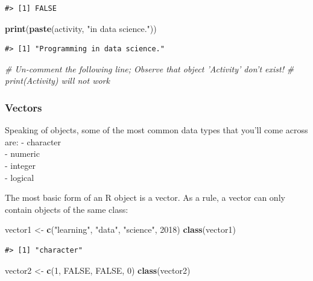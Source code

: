 \documentclass[]{article}
\newenvironment{Shaded}{\begin{snugshade}}{\end{snugshade}}
\newcommand{\CommentTok}[1]{\textcolor[rgb]{0.56,0.35,0.01}{\textit{#1}}}
\newcommand{\DecValTok}[1]{\textcolor[rgb]{0.00,0.00,0.81}{#1}}
\newcommand{\KeywordTok}[1]{\textcolor[rgb]{0.13,0.29,0.53}{\textbf{#1}}}
\newcommand{\NormalTok}[1]{#1}
\newcommand{\OtherTok}[1]{\textcolor[rgb]{0.56,0.35,0.01}{#1}}
\newcommand{\StringTok}[1]{\textcolor[rgb]{0.31,0.60,0.02}{#1}}
\begin{document}
\begin{verbatim}
#> [1] FALSE
\end{verbatim}

\begin{Shaded}
\begin{Highlighting}[]
\KeywordTok{print}\NormalTok{(}\KeywordTok{paste}\NormalTok{(activity, }\StringTok{"in data science."}\NormalTok{))}
\end{Highlighting}
\end{Shaded}

\begin{verbatim}
#> [1] "Programming in data science."
\end{verbatim}

\begin{Shaded}
\begin{Highlighting}[]
\CommentTok{# Un-comment the following line; Observe that object 'Activity' don't exist!}
\CommentTok{# print(Activity) will not work}
\end{Highlighting}
\end{Shaded}

\hypertarget{vectors}{%
\subsubsection{Vectors}\label{vectors}}

Speaking of objects, some of the most common data types that you'll come
across are: - character\\
- numeric\\
- integer\\
- logical

The most basic form of an R object is a vector. As a rule, a vector can
only contain objects of the same class:

\begin{Shaded}
\begin{Highlighting}[]
\NormalTok{vector1 <-}\StringTok{ }\KeywordTok{c}\NormalTok{(}\StringTok{"learning"}\NormalTok{, }\StringTok{"data"}\NormalTok{, }\StringTok{"science"}\NormalTok{, }\DecValTok{2018}\NormalTok{)}
\KeywordTok{class}\NormalTok{(vector1)}
\end{Highlighting}
\end{Shaded}

\begin{verbatim}
#> [1] "character"
\end{verbatim}

\begin{Shaded}
\begin{Highlighting}[]
\NormalTok{vector2 <-}\StringTok{ }\KeywordTok{c}\NormalTok{(}\DecValTok{1}\NormalTok{, }\OtherTok{FALSE}\NormalTok{, }\OtherTok{FALSE}\NormalTok{, }\DecValTok{0}\NormalTok{)}
\KeywordTok{class}\NormalTok{(vector2)}
\end{Highlighting}
\end{Shaded}
\end{document}
